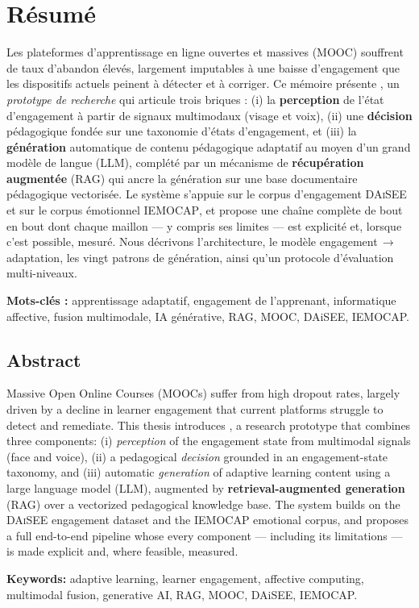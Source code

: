 \chapter*{Résumé}
\mtcaddchapter

Les plateformes d'apprentissage en ligne ouvertes et massives (MOOC) souffrent de
taux d'abandon élevés, largement imputables à une baisse d'engagement que les
dispositifs actuels peinent à détecter et à corriger. Ce mémoire présente
\emolearn{}, un \emph{prototype de recherche} qui articule trois briques : (i) la
\textbf{perception} de l'état d'engagement à partir de signaux multimodaux
(visage et voix), (ii) une \textbf{décision} pédagogique fondée sur une taxonomie
d'états d'engagement, et (iii) la \textbf{génération} automatique de contenu
pédagogique adaptatif au moyen d'un grand modèle de langue (LLM), complété par
un mécanisme de \textbf{récupération augmentée} (RAG) qui ancre la génération
sur une base documentaire pédagogique vectorisée. Le système
s'appuie sur le corpus d'engagement \textsc{DAiSEE} et sur le corpus émotionnel
\textsc{IEMOCAP}, et propose une chaîne complète de bout en bout dont chaque
maillon — y compris ses limites — est explicité et, lorsque c'est possible,
mesuré. Nous décrivons l'architecture, le modèle engagement\,$\rightarrow$\,adaptation,
les vingt patrons de génération, ainsi qu'un protocole d'évaluation multi-niveaux.

\vspace{0.5cm}
\noindent\textbf{Mots-clés :} apprentissage adaptatif, engagement de l'apprenant,
informatique affective, fusion multimodale, IA générative, RAG, MOOC, DAiSEE,
IEMOCAP.

\vspace{1cm}
\section*{Abstract}

Massive Open Online Courses (MOOCs) suffer from high dropout rates, largely driven
by a decline in learner engagement that current platforms struggle to detect and
remediate. This thesis introduces \emolearn{}, a research prototype that combines
three components: (i) \emph{perception} of the engagement state from multimodal
signals (face and voice), (ii) a pedagogical \emph{decision} grounded in an
engagement-state taxonomy, and (iii) automatic \emph{generation} of adaptive
learning content using a large language model (LLM), augmented by
\textbf{retrieval-augmented generation} (RAG) over a vectorized pedagogical
knowledge base. The system builds on the
\textsc{DAiSEE} engagement dataset and the \textsc{IEMOCAP} emotional corpus, and
proposes a full end-to-end pipeline whose every component --- including its
limitations --- is made explicit and, where feasible, measured.

\vspace{0.5cm}
\noindent\textbf{Keywords:} adaptive learning, learner engagement, affective
computing, multimodal fusion, generative AI, RAG, MOOC, DAiSEE, IEMOCAP.
